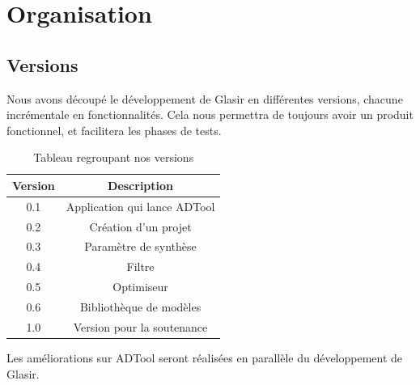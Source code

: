 \section{Organisation}
	\subsection{Versions}
		Nous avons découpé le développement de Glasir en différentes versions, chacune incrémentale en fonctionnalités.
		Cela nous permettra de toujours avoir un produit fonctionnel, et facilitera les phases de tests.

		\begin{table}[h!]
			\begin{center}
			\begin{tabular}{|c|c|}
				\hline
				Version & Description\\
				\hline
				0.1 & Application qui lance ADTool\\
				\hline
				0.2 & Création d'un projet\\
				\hline
				0.3 & Paramètre de synthèse\\
				\hline
				0.4 & Filtre\\
				\hline
				0.5 & Optimiseur\\
				\hline
				0.6 & Bibliothèque de modèles\\
				\hline
				1.0 & Version pour la soutenance\\
				\hline
			\end{tabular}
			\end{center}
			\caption{Tableau regroupant nos versions}
		\end{table}

		Les améliorations sur ADTool seront réalisées en parallèle du développement de Glasir.

